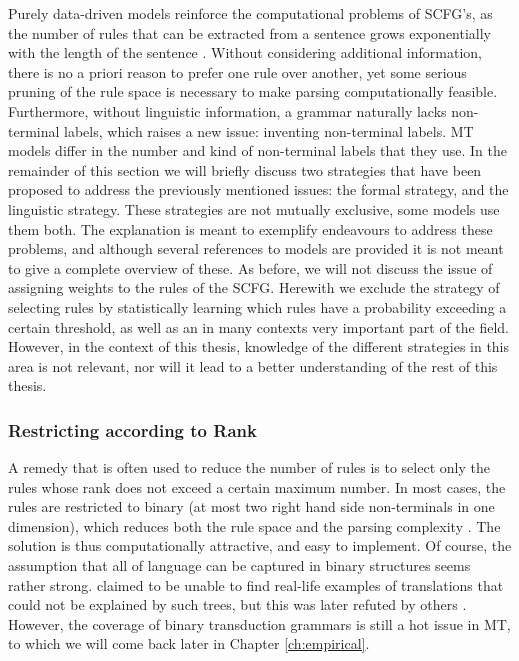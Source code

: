 \documentclass{report}
\theoremstyle{break}
\begin{document}
Purely data-driven models reinforce the computational problems of SCFG's, as the number of rules that can be extracted from a sentence grows exponentially with the length of the sentence \citep{quirk2006dependency}. Without considering additional information, there is no a priori reason to prefer one rule over another, yet some serious pruning of the rule space is necessary to make parsing computationally feasible. Furthermore, without linguistic information, a grammar naturally lacks non-terminal labels, which raises a new issue: inventing non-terminal labels. MT models differ in the number and kind of non-terminal labels that they use. In the remainder of this section we will briefly discuss two strategies that have been proposed to address the previously mentioned issues: the formal strategy, and the linguistic strategy. These strategies are not mutually exclusive, some models use them both. The explanation is meant to exemplify endeavours to address these problems, and although several references to models are provided it is not meant to give a complete overview of these. As before, we will not discuss the issue of assigning weights to the rules of the SCFG. Herewith we exclude the strategy of selecting rules by statistically learning which rules have a probability exceeding a certain threshold, as well as an in many contexts very important part of the field. However, in the context of this thesis, knowledge of the different strategies in this area is not relevant, nor will it lead to a better understanding of the rest of this thesis.

\subsubsection{Restricting according to Rank}

A remedy that is often used to reduce the number of rules is to select only the rules whose rank does not exceed a certain maximum number. In most cases, the rules are restricted to binary (at most two right hand side non-terminals in one dimension), which reduces both the rule space and the parsing complexity \citep[e.g,][]{wu1997stochastic,chiang2005hierarchical,mylonakis2011learning}. The solution is thus computationally attractive, and easy to implement. Of course, the assumption that all of language can be captured in binary structures seems rather strong. \citeauthor{wu1997stochastic} claimed to be unable to find real-life examples of translations that could not be explained by such trees, but this was later refuted by others \citep[e.g.,][]{galley2004s}. However, the coverage of binary transduction grammars is still a hot issue in MT, to which we will come back later in Chapter \ref{ch:empirical}. 
\end{document}
